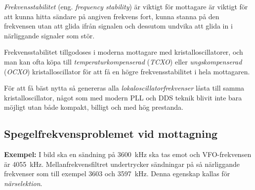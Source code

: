 \emph{Frekvensstabilitet} (eng. \emph{frequency stability}) är viktigt för
mottagare är viktigt för att kunna hitta sändare på angiven frekvens fort,
kunna stanna på den frekvensen utan att glida ifrån signalen och dessutom
undvika att glida in i närliggande signaler som stör.

Frekvensstabilitet tillgodoses i moderna mottagare med kristalloscillatorer,
och man kan ofta köpa till \emph{temperaturkompenserad} (\emph{TCXO}) eller
\emph{ungskompenserad} (\emph{OCXO}) kristalloscillator för att få en högre
frekvensstabilitet i hela mottagaren.

För att få bäst nytta så genereras alla \emph{lokaloscillatorfrekvenser} låsta
till samma kristalloscillator, något som med modern PLL och DDS teknik blivit
inte bara möjligt utan både kompakt, billigt och med hög prestanda.


\newpage
\subsection{Spegelfrekvensproblemet vid mottagning}
\label{spegelfrekvens_mottagare}


\textbf{Exempel:}
I bild  ska en sändning på \SI{3600}{\kilo\hertz} ska tas
emot och VFO-frekvensen är \SI{4055}{\kilo\hertz}.
Mellanfrekvensfiltret undertrycker sändningar på så närliggande frekvenser
som till exempel 3603 och \SI{3597}{\kilo\hertz}.
Denna egenskap kallas för \emph{närselektion}.

